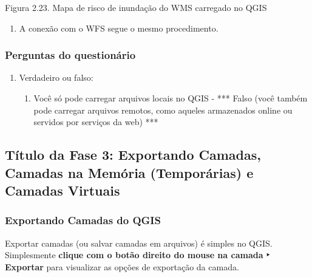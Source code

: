 \documentclass[
]{book}
\providecommand{\tightlist}{%
  \setlength{\itemsep}{0pt}\setlength{\parskip}{0pt}}
\begin{document}
Figura 2.23. Mapa de risco de inundação do WMS carregado no QGIS

\begin{enumerate}
\def\labelenumi{\arabic{enumi}.}
\setcounter{enumi}{6}
\tightlist
\item
  A conexão com o WFS segue o mesmo procedimento.
\end{enumerate}

\hypertarget{perguntas-do-questionuxe1rio-6}{%
\subsubsection{\texorpdfstring{\textbf{Perguntas do questionário}}{Perguntas do questionário}}\label{perguntas-do-questionuxe1rio-6}}

\begin{enumerate}
\def\labelenumi{\arabic{enumi}.}
\item
  Verdadeiro ou falso:

  \begin{enumerate}
  \def\labelenumii{\arabic{enumii}.}
  \tightlist
  \item
    Você só pode carregar arquivos locais no QGIS - *** Falso (você também pode carregar arquivos remotos, como aqueles armazenados online ou servidos por serviços da web) ***
  \end{enumerate}
\end{enumerate}

\hypertarget{tuxedtulo-da-fase-3-exportando-camadas-camadas-na-memuxf3ria-temporuxe1rias-e-camadas-virtuais}{%
\subsection{Título da Fase 3: Exportando Camadas, Camadas na Memória (Temporárias) e Camadas Virtuais}\label{tuxedtulo-da-fase-3-exportando-camadas-camadas-na-memuxf3ria-temporuxe1rias-e-camadas-virtuais}}

\hypertarget{exportando-camadas-do-qgis}{%
\subsubsection{\texorpdfstring{\textbf{Exportando Camadas do QGIS}}{Exportando Camadas do QGIS}}\label{exportando-camadas-do-qgis}}

Exportar camadas (ou salvar camadas em arquivos) é simples no QGIS. Simplesmente \textbf{clique com o botão direito do mouse na camada ‣ Exportar} para visualizar as opções de exportação da camada.
\end{document}
